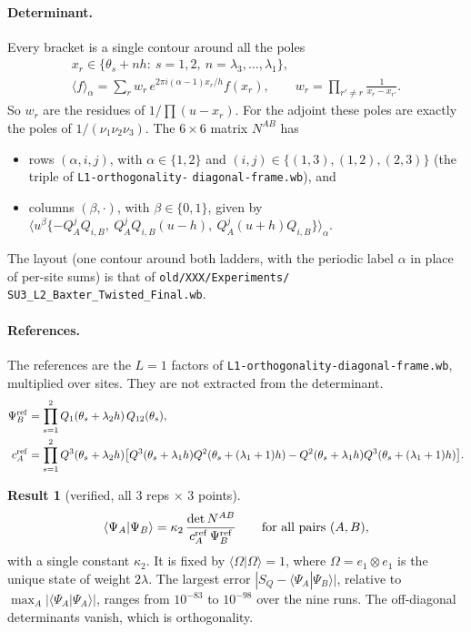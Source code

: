 \documentclass[11pt]{article}
\newcommand{\nb}[1]{\texttt{#1}}
\theoremstyle{definition}
\newtheorem{result}{Result}
\theoremstyle{remark}
\begin{document}
\paragraph{Determinant.}
Every bracket is a single contour around all the poles
\begin{gather}
x_r\in\{\theta_s+nh:\ s=1,2,\ n=\lambda_3,\dots,\lambda_1\},\\
\langle f\rangle_\alpha=\sum_r w_r\,e^{2\pi i(\alpha-1)x_r/h}f(x_r),\qquad w_r=\prod_{r'\neq r}\frac{1}{x_r-x_{r'}} .
\end{gather}
So $w_r$ are the residues of $1/\prod(u-x_r)$. For the adjoint these poles are exactly the poles of $1/(\nu_1\nu_2\nu_3)$. The $6\times6$ matrix $N^{AB}$ has
\begin{itemize}
\item rows $(\alpha,i,j)$, with $\alpha\in\{1,2\}$ and $(i,j)\in\{(1,3),(1,2),(2,3)\}$ (the triple of \nb{L1-orthogonality-} \nb{diagonal-frame.wb}), and
\item columns $(\beta,\cdot)$, with $\beta\in\{0,1\}$, given by $\langle u^\beta\{-Q^j_AQ_{i,B},\ Q^j_AQ_{i,B}(u-h),\ Q^j_A(u+h)Q_{i,B}\}\rangle_\alpha$.
\end{itemize}
The layout (one contour around both ladders, with the periodic label $\alpha$ in place of per-site sums) is that of \nb{old/XXX/Experiments/} \nb{SU3\_L2\_Baxter\_Twisted\_Final.wb}.

\paragraph{References.}
The references are the $L=1$ factors of \nb{L1-orthogonality-diagonal-frame.wb}, multiplied over sites. They are not extracted from the determinant.
\begin{align}
\Psi^{\rm ref}_B&=\prod_{s=1}^2Q_1(\theta_s+\lambda_2h)\,Q_{12}(\theta_s),\\
c^{\rm ref}_A&=\prod_{s=1}^2Q^3(\theta_s+\lambda_2h)\big[Q^3(\theta_s+\lambda_1h)Q^2(\theta_s+(\lambda_1+1)h)-Q^2(\theta_s+\lambda_1h)Q^3(\theta_s+(\lambda_1+1)h)\big].
\end{align}

\begin{result}[verified, all 3 reps $\times$ 3 points]\label{res:sp}
\begin{equation}
\langle\Psi_A|\Psi_B\rangle=\kappa_2\,\frac{\det N^{AB}}{c^{\rm ref}_A\,\Psi^{\rm ref}_B}\qquad\text{for all pairs }(A,B),
\end{equation}
with a single constant $\kappa_2$. It is fixed by $\langle\Omega|\Omega\rangle=1$, where $\Omega=e_1\otimes e_1$ is the unique state of weight $2\lambda$. The largest error $|S_Q-\langle\Psi_A|\Psi_B\rangle|$, relative to $\max_A|\langle\Psi_A|\Psi_A\rangle|$, ranges from $10^{-83}$ to $10^{-98}$ over the nine runs. The off-diagonal determinants vanish, which is orthogonality.
\end{result}
\end{document}
